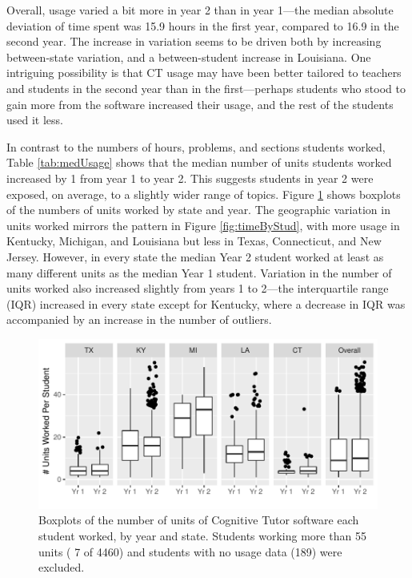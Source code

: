 \documentclass[12pt]{article}\usepackage[]{graphicx}\usepackage[]{color}
\makeatletter
\def\maxwidth{ %
  \ifdim\Gin@nat@width>\linewidth
    \linewidth
  \else
    \Gin@nat@width
  \fi
}
\makeatother
\begin{document}
Overall, usage varied a bit more in year 2 than in year
1---the median absolute deviation of time spent was 15.9 hours in the first year, compared to 16.9 in  the second year.
The increase in variation seems to be driven both by increasing
between-state variation, and a between-student increase in Louisiana.
One intriguing possibility is that CT usage may have been better tailored to
teachers and students in the second year than in the first---perhaps
students who stood to gain more from the software increased their
usage, and the rest of the students used it less.

In contrast to the numbers of hours, problems, and sections students
worked, Table \ref{tab:medUsage} shows that the median number of units
students worked increased by
1
from year 1 to year 2.
This suggests students in year 2 were exposed, on average, to a
slightly wider range of topics.
Figure \ref{fig:unitsByStud} shows boxplots of the numbers of units
worked by state and year.
The geographic variation in units worked mirrors the pattern in Figure
\ref{fig:timeByStud}, with more usage in Kentucky, Michigan, and
Louisiana but less in Texas, Connecticut, and New Jersey.
However, in every state the median Year 2 student worked at least as
many different units as the median Year 1 student.
Variation in the number of units worked also increased slightly
from years 1 to 2---the interquartile range (IQR) increased in every state
except for Kentucky, where a decrease in IQR was accompanied by an
increase in the number of outliers.



\begin{figure}
\centering

\includegraphics[width=\maxwidth]{figure/unitsWorked-1} 

\caption{Boxplots of the number of units of Cognitive Tutor
  software each student worked, by year and state. Students
  working more than 55 units (
  7 of
  4460) and students
  with no usage data (189)
  were excluded.}
\label{fig:unitsByStud}
\end{figure}
\end{document}
